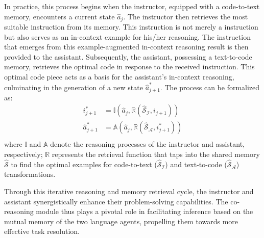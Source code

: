 \documentclass[11pt]{article}
\begin{document}
In practice, this process begins when the instructor, equipped with a code-to-text memory, encounters a current state \( \hat{a}_j \). The instructor then retrieves the most suitable instruction from its memory. This instruction is not merely a instruction but also serves as an in-context example for his/her reasoning. The instruction that emerges from this example-augmented in-context reasoning result is then provided to the assistant.
Subsequently, the assistant, possessing a text-to-code memory, retrieves the optimal code in response to the received instruction. This optimal code piece acts as a basis for the assistant's in-context reasoning, culminating in the generation of a new state \( \hat{a}_{j+1}^* \). The process can be formalized as:
\[
\begin{aligned}
i_{j+1}^* &= \mathbb{I}(\hat{a}_j, \mathbb{R}(\hat{\mathcal{S}}_\mathcal{I}, i_{j+1})) \\
\hat{a}_{j+1}^* &= \mathbb{A}(\hat{a}_j, \mathbb{R}(\hat{\mathcal{S}}_\mathcal{A}, i_{j+1}^*)) \\
\end{aligned}
\]
where \( \mathbb{I} \) and \( \mathbb{A} \) denote the reasoning processes of the instructor and assistant, respectively; \( \mathbb{R} \) represents the retrieval function that taps into the shared memory \( \hat{\mathcal{S}} \) to find the optimal examples for code-to-text (\( \hat{\mathcal{S}}_\mathcal{I} \)) and text-to-code (\( \hat{\mathcal{S}}_\mathcal{A} \)) transformations.

Through this iterative reasoning and memory retrieval cycle, the instructor and assistant synergistically enhance their problem-solving capabilities. The co-reasoning module thus plays a pivotal role in facilitating inference based on the mutual memory of the two language agents, propelling them towards more effective task resolution.
\end{document}
